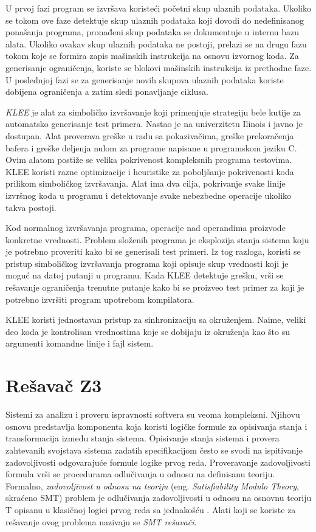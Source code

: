 \documentclass[12pt,oneside]{memoir}
\begin{document}
U prvoj fazi program se izvršava koristeći početni skup ulaznih podataka. Ukoliko se tokom ove faze detektuje skup ulaznih podataka koji dovodi do nedefinisanog ponašanja programa, pronađeni skup podataka se dokumentuje u internu bazu alata. Ukoliko ovakav skup ulaznih podataka ne postoji, prelazi se na drugu fazu tokom koje se formira zapis mašinskih instrukcija na osnovu izvornog koda. Za generisanje ograničenja, koriste se blokovi mašinskih instrukcija iz prethodne faze. U poslednjoj fazi se za generisanje novih skupova ulaznih podataka koriste dobijena ograničenja a zatim sledi ponavljanje ciklusa. 
\par
\emph{KLEE} \cite{ToolKLEE} je alat za simboličko izvršavanje \cite{SymbolicExecution} koji primenjuje strategiju bele kutije za automatsko generisanje test primera. 
Nastao je na univerzitetu Ilinois i javno je dostupan.
Alat proverava greške u radu sa pokazivačima, greške prekoračenja bafera i greške deljenja nulom za programe napisane u programskom jeziku C. Ovim alatom postiže se velika pokrivenost kompleksnih programa testovima. KLEE koristi razne optimizacije i heuristike za poboljšanje pokrivenosti koda prilikom simboličkog izvršavanja. Alat ima dva cilja, pokrivanje svake linije izvršnog koda u programu i detektovanje svake nebezbedne operacije ukoliko takva postoji. \par
Kod normalnog izvršavanja programa, operacije nad operandima proizvode konkretne vrednosti. Problem složenih programa je eksplozija stanja sistema koju je potrebno proveriti kako bi se generisali test primeri. Iz tog razloga, koristi se pristup simboličkog izvršavanja programa koji opisuje skup vrednosti koji je moguć na datoj putanji u programu. Kada KLEE detektuje grešku, vrši se rešavanje ograničenja trenutne putanje kako bi se proizveo test primer za koji je potrebno izvršiti program upotrebom kompilatora. 
\par 
KLEE koristi jednostavan pristup za sinhronizaciju sa okruženjem. Naime, veliki deo koda je kontrolisan vrednostima koje se dobijaju iz okruženja kao što su argumenti komandne linije i fajl sistem. 
 
\chapter{Rešavač Z3} \label{resavac}
\label{chp:razrada}

Sistemi za analizu i proveru ispravnosti softvera su veoma kompleksni. Njihovu osnovu predstavlja komponenta koja koristi logičke formule za opisivanja stanja i transformacija između stanja sistema. Opisivanje stanja sistema i provera zahtevanih svojstava sistema zadatih specifikacijom često se svodi na ispitivanje zadovoljivosti odgovarajuće formule logike prvog reda.
Proveravanje zadovoljivosti formula vrši se procedurama odlučivanja u odnosu na definisanu teoriju. Formalno, \emph{zadovoljivost u odnosu na teoriju} (eng. \textit{Satisfiability Modulo Theory}, skraćeno SMT) problem je odlučivanja zadovoljivosti u odnosu na osnovnu teoriju T opisanu u klasičnoj logici prvog reda sa jednakošću \cite{Barrett}. Alati koji se koriste za rešavanje ovog problema nazivaju se \emph{SMT rešavači}. 
\par
\end{document}
